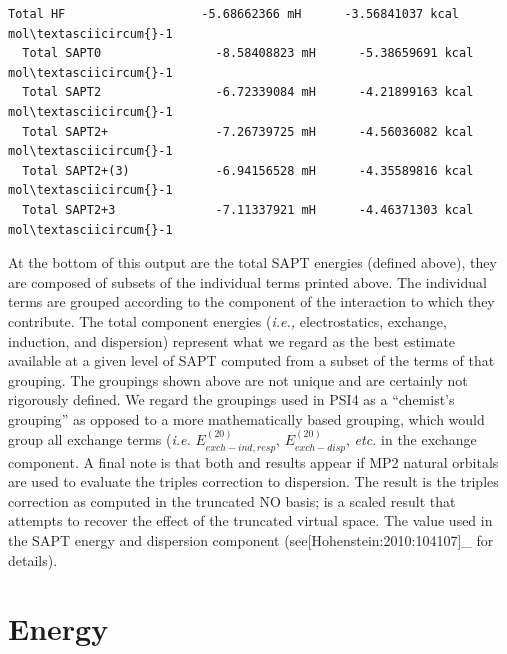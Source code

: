 \documentclass[letterpaper,10pt,english]{sphinxmanual}
\begin{document}
\begin{Verbatim}[commandchars=\\\{\}]
  Total HF                   -5.68662366 mH      -3.56841037 kcal mol\textasciicircum{}-1
  Total SAPT0                -8.58408823 mH      -5.38659691 kcal mol\textasciicircum{}-1
  Total SAPT2                -6.72339084 mH      -4.21899163 kcal mol\textasciicircum{}-1
  Total SAPT2+               -7.26739725 mH      -4.56036082 kcal mol\textasciicircum{}-1
  Total SAPT2+(3)            -6.94156528 mH      -4.35589816 kcal mol\textasciicircum{}-1
  Total SAPT2+3              -7.11337921 mH      -4.46371303 kcal mol\textasciicircum{}-1
\end{Verbatim}

At the bottom of this output are the total SAPT energies (defined above),
they are composed of subsets of the individual terms printed above. The
individual terms are grouped according to the component of the interaction
to which they contribute. The total component energies (\emph{i.e.,}
electrostatics, exchange, induction, and dispersion) represent what we
regard as the best estimate available at a given level of SAPT computed
from a subset of the terms of that grouping. The groupings shown above are
not unique and are certainly not rigorously defined. We regard the groupings
used in PSI4 as a ``chemist's grouping'' as opposed to a more
mathematically based grouping, which would group all exchange terms
(\emph{i.e.} $E_{exch-ind,resp}^{(20)}$, $E_{exch-disp}^{(20)}$, \emph{etc.} in
the exchange component. A final note is that both 
and  results appear if MP2 natural orbitals are
used to evaluate the triples correction to dispersion. The 
result is the triples correction as computed in the truncated NO basis;
 is a scaled result that attempts to recover
the effect of the truncated virtual space. The 
value used in the SAPT energy and dispersion component (see{[}Hohenstein:2010:104107{]}\_ for details).


\chapter{Energy}
\label{index:energy}
\end{document}

